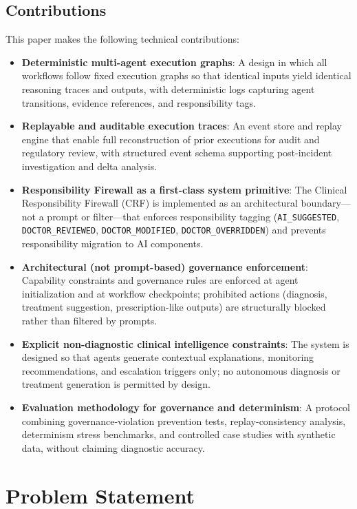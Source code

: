 \documentclass[journal]{IEEEtran}
\begin{document}
\subsection{Contributions}
This paper makes the following technical contributions:
\begin{itemize}
    \item \textbf{Deterministic multi-agent execution graphs}: A design in which all workflows follow fixed execution graphs so that identical inputs yield identical reasoning traces and outputs, with deterministic logs capturing agent transitions, evidence references, and responsibility tags.
    \item \textbf{Replayable and auditable execution traces}: An event store and replay engine that enable full reconstruction of prior executions for audit and regulatory review, with structured event schema supporting post-incident investigation and delta analysis.
    \item \textbf{Responsibility Firewall as a first-class system primitive}: The Clinical Responsibility Firewall (CRF) is implemented as an architectural boundary—not a prompt or filter—that enforces responsibility tagging (\texttt{AI\_SUGGESTED}, \texttt{DOCTOR\_REVIEWED}, \texttt{DOCTOR\_MODIFIED}, \texttt{DOCTOR\_OVERRIDDEN}) and prevents responsibility migration to AI components.
    \item \textbf{Architectural (not prompt-based) governance enforcement}: Capability constraints and governance rules are enforced at agent initialization and at workflow checkpoints; prohibited actions (diagnosis, treatment suggestion, prescription-like outputs) are structurally blocked rather than filtered by prompts.
    \item \textbf{Explicit non-diagnostic clinical intelligence constraints}: The system is designed so that agents generate contextual explanations, monitoring recommendations, and escalation triggers only; no autonomous diagnosis or treatment generation is permitted by design.
    \item \textbf{Evaluation methodology for governance and determinism}: A protocol combining governance-violation prevention tests, replay-consistency analysis, determinism stress benchmarks, and controlled case studies with synthetic data, without claiming diagnostic accuracy.
\end{itemize}

\newpage
\section{Problem Statement}
\end{document}
